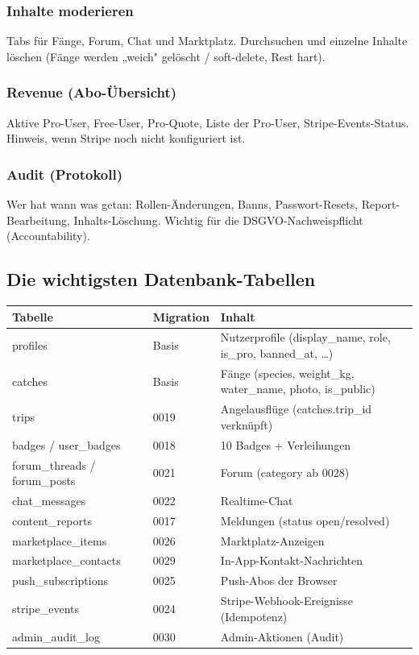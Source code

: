 \documentclass[11pt, a4paper]{article}
\begin{document}
\subsubsection{Inhalte moderieren}
Tabs für Fänge, Forum, Chat und Marktplatz. Durchsuchen und einzelne Inhalte löschen (Fänge werden „weich" gelöscht / soft-delete, Rest hart).

\subsubsection{Revenue (Abo-Übersicht)}
Aktive Pro-User, Free-User, Pro-Quote, Liste der Pro-User, Stripe-Events-Status. Hinweis, wenn Stripe noch nicht konfiguriert ist.

\subsubsection{Audit (Protokoll)}
Wer hat wann was getan: Rollen-Änderungen, Banns, Passwort-Resets, Report-Bearbeitung, Inhalts-Löschung. Wichtig für die DSGVO-Nachweispflicht (Accountability).

\subsection{Die wichtigsten Datenbank-Tabellen}

\begin{tabularx}{\textwidth}{llX}
\toprule
\textbf{Tabelle} & \textbf{Migration} & \textbf{Inhalt} \\
\midrule
profiles & Basis & Nutzerprofile (display\_name, role, is\_pro, banned\_at, \dots) \\
catches & Basis & Fänge (species, weight\_kg, water\_name, photo, is\_public) \\
trips & 0019 & Angelausflüge (catches.trip\_id verknüpft) \\
badges / user\_badges & 0018 & 10 Badges + Verleihungen \\
forum\_threads / forum\_posts & 0021 & Forum (category ab 0028) \\
chat\_messages & 0022 & Realtime-Chat \\
content\_reports & 0017 & Meldungen (status open/resolved) \\
marketplace\_items & 0026 & Marktplatz-Anzeigen \\
marketplace\_contacts & 0029 & In-App-Kontakt-Nachrichten \\
push\_subscriptions & 0025 & Push-Abos der Browser \\
stripe\_events & 0024 & Stripe-Webhook-Ereignisse (Idempotenz) \\
admin\_audit\_log & 0030 & Admin-Aktionen (Audit) \\
\bottomrule
\end{tabularx}
\end{document}
